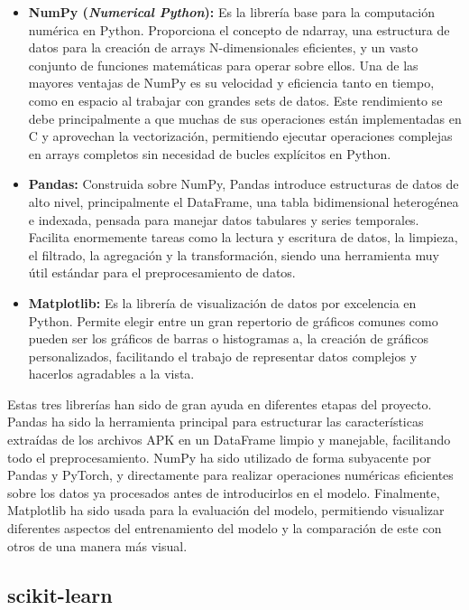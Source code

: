 \begin{itemize}
	\item \textbf{NumPy (\textit{Numerical Python}):} Es la librería base para la computación numérica en Python. Proporciona el concepto de ndarray, una estructura de datos para la creación de arrays N-dimensionales eficientes, y un vasto conjunto de funciones matemáticas para operar sobre ellos. Una de las mayores ventajas de NumPy es su velocidad y eficiencia tanto en tiempo, como en espacio al trabajar con grandes sets de datos. Este rendimiento se debe principalmente a que muchas de sus operaciones están implementadas en C y aprovechan la vectorización, permitiendo ejecutar operaciones complejas en arrays completos sin necesidad de bucles explícitos en Python.
	
	\item \textbf{Pandas:} Construida sobre NumPy, Pandas introduce estructuras de datos de alto nivel, principalmente el DataFrame, una tabla bidimensional heterogénea e indexada, pensada para manejar datos tabulares y series temporales. Facilita enormemente tareas como la lectura y escritura de datos, la limpieza, el filtrado, la agregación y la transformación, siendo una herramienta muy útil estándar para el preprocesamiento de datos.

	\item \textbf{Matplotlib:} Es la librería de visualización de datos por excelencia en Python. Permite elegir entre un gran repertorio de gráficos comunes como pueden ser los gráficos de barras o histogramas a, la creación de gráficos personalizados, facilitando el trabajo de representar datos complejos y hacerlos agradables a la vista.
	
\end{itemize}

Estas tres librerías han sido de gran ayuda en diferentes etapas del proyecto. Pandas ha sido la herramienta principal para estructurar las características extraídas de los archivos APK en un DataFrame limpio y manejable, facilitando todo el preprocesamiento. NumPy ha sido utilizado de forma subyacente por Pandas y PyTorch, y directamente para realizar operaciones numéricas eficientes sobre los datos ya procesados antes de introducirlos en el modelo. Finalmente, Matplotlib ha sido usada para la evaluación del modelo, permitiendo visualizar diferentes aspectos del entrenamiento del modelo y la comparación de este con otros de una manera más visual.

\subsection{scikit-learn}

